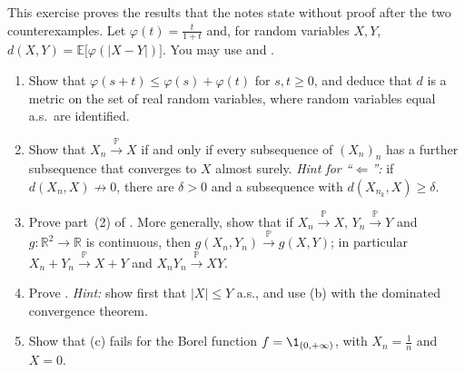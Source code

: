\begin{exercise}\label{ex:ll-criterion}
\hard This exercise proves the results that the notes state without proof after the two
counterexamples. Let $\varphi(t)=\frac t{1+t}$ and, for random variables $X,Y$,
$d(X,Y)=\mathbb E\big[\varphi(|X-Y|)\big]$. You may use  and
.
\begin{enumerate}[label=(\alph*)]
  \item Show that $\varphi(s+t)\le\varphi(s)+\varphi(t)$ for $s,t\ge0$, and deduce that $d$ is a
    metric on the set of real random variables, where random variables equal a.s.\ are
    identified.
  \item Show that $X_n\xrightarrow{\mathbb P}X$ if and only if every subsequence of $(X_n)_n$ has
    a further subsequence that converges to $X$ almost surely. \emph{Hint for ``$\Leftarrow$'':}
    if $d(X_n,X)\not\to0$, there are $\delta>0$ and a subsequence with $d(X_{n_k},X)\ge\delta$.
  \item Prove part~(2) of . More generally, show that if
    $X_n\xrightarrow{\mathbb P}X$, $Y_n\xrightarrow{\mathbb P}Y$ and $g:\mathbb R^2\to\mathbb R$ is
    continuous, then $g(X_n,Y_n)\xrightarrow{\mathbb P}g(X,Y)$; in particular
    $X_n+Y_n\xrightarrow{\mathbb P}X+Y$ and $X_nY_n\xrightarrow{\mathbb P}XY$.
  \item Prove . \emph{Hint:} show first that $|X|\le Y$ a.s., and
    use (b) with the dominated convergence theorem.
  \item Show that (c) fails for the Borel function $f=\1_{(0,+\infty)}$, with $X_n=\frac1n$ and
    $X=0$.
\end{enumerate}
\end{exercise}

